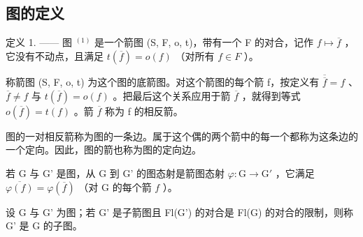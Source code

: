\subsection{图的定义}

定义 1. —— 图 \(^{(1)}\) 是一个箭图 (S, F, o, t)，带有一个 F 的对合，记作 \(f \mapsto \overline{f}\) ，它没有不动点，且满足 \(t(\overline{f}) = o(f)\) （对所有 \(f \in F\) ）。

称箭图 (S, F, o, t) 为这个图的底箭图。对这个箭图的每个箭 f，按定义有 \(\overline{\overline{f}} = f\) 、\(\overline{f} \neq f\) 与 \(t(\overline{f}) = o(f)\) 。把最后这个关系应用于箭 \(\overline{f}\) ，就得到等式 \(o(\overline{f}) = t(f)\) 。箭 \(\overline{f}\) 称为 f 的相反箭。

图的一对相反箭称为图的一条边。属于这个偶的两个箭中的每一个都称为这条边的一个定向。因此，图的箭也称为图的定向边。

若 G 与 G' 是图，从 G 到 G' 的图态射是箭图态射 \(\varphi\colon\mathrm{G}\to\mathrm{G}'\) ，它满足 \(\overline{\varphi(f)}=\varphi(\overline{f})\) （对 G 的每个箭 \(f\) ）。

设 G 与 G' 为图；若 G' 是子箭图且 Fl(G') 的对合是 Fl(G) 的对合的限制，则称 G' 是 G 的子图。

